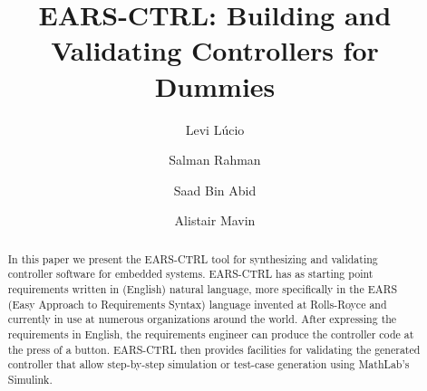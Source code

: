 \documentclass{llncs}
\begin{document}
%
\frontmatter          %

\mainmatter              %
%
\title{EARS-CTRL: Building and Validating Controllers for Dummies}
%
\titlerunning{}  %
%
\author{Levi L\'ucio \and Salman Rahman
 \and Saad Bin Abid \and Alistair Mavin}
%
\authorrunning{} %
%
\tocauthor{}
%

\maketitle              %
\vspace{-.5cm}
\begin{abstract}
In this paper we present the EARS-CTRL tool for synthesizing and validating
controller software for embedded systems. EARS-CTRL has as starting point
requirements written in (English) natural language, more specifically in the
EARS (Easy Approach to Requirements Syntax) language invented at Rolls-Royce and
currently in use at numerous organizations around the world. After expressing
the requirements in English, the requirements engineer can produce the
controller code at the press of a button.
EARS-CTRL then provides facilities for validating the generated controller that
allow step-by-step simulation or test-case generation using MathLab's
Simulink.\vspace{-.4cm}
\end{abstract}

 








\vspace{-.4cm}
%

%
% 


\end{document}
